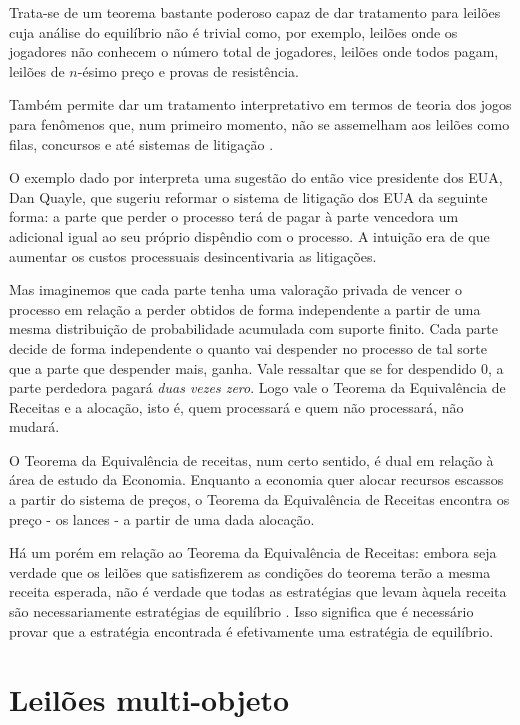 Trata-se de um teorema bastante poderoso capaz de dar tratamento para leilões cuja análise do equilíbrio não é trivial como, por exemplo, leilões onde os jogadores não conhecem o número total de jogadores, leilões onde todos pagam, leilões de $n$-ésimo preço e provas de resistência.

Também permite dar um tratamento interpretativo em termos de teoria dos jogos para fenômenos que, num primeiro momento, não se assemelham aos leilões como filas, concursos e até sistemas de litigação \citet{Klemperer2004-qd}.

O exemplo dado por \citet{Klemperer2004-qd} interpreta uma sugestão do então vice presidente dos EUA, Dan Quayle, que sugeriu reformar o sistema de litigação dos EUA da seguinte forma: a parte que perder o processo terá de pagar à parte vencedora um adicional igual ao seu próprio dispêndio com o processo. A intuição era de que aumentar os custos processuais desincentivaria as litigações.

Mas imaginemos que cada parte tenha uma valoração privada de vencer o processo em relação a perder obtidos de forma independente a partir de uma mesma distribuição de probabilidade acumulada com suporte finito. Cada parte decide de forma independente o quanto vai despender no processo de tal sorte que a parte que despender mais, ganha. Vale ressaltar que se for despendido 0, a parte perdedora pagará \emph{duas vezes zero}. Logo vale o Teorema da Equivalência de Receitas e a alocação, isto é, quem processará e quem não processará, não mudará.

O Teorema da Equivalência de receitas, num certo sentido, é dual em relação à área de estudo da Economia. Enquanto a economia quer alocar recursos escassos a partir do sistema de preços, o Teorema da Equivalência de Receitas encontra os preço - os lances - a partir de uma dada alocação.

Há um porém em relação ao Teorema da Equivalência de Receitas: embora seja verdade que os leilões que satisfizerem as condições do teorema terão a mesma receita esperada, não é verdade que todas as estratégias que levam àquela receita são necessariamente estratégias de equilíbrio \citet{Shoham2008}. Isso significa que é necessário provar que a estratégia encontrada é efetivamente uma estratégia de equilíbrio.

\section{Leilões multi-objeto}

